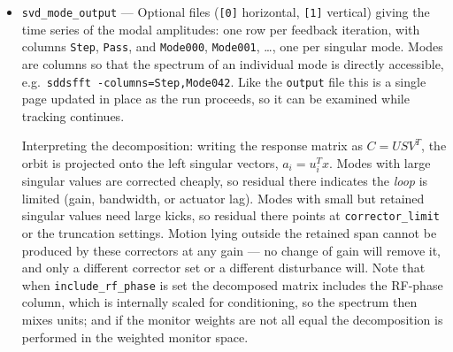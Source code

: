 \documentclass[11pt]{article}
\begin{document}
\begin{itemize}
  Note the normalization, which differs from the rms columns of the \verb|output| file:
  \verb|RmsAmplitude| is the modal \emph{coefficient} $a_i=u_i^T x$ (in m) and is not divided by the
  number of monitors, whereas \verb|xBpmRms| and its relatives are.  Since the $u_i$ are orthonormal,
  the two are related by $\sum_i a_i^2 = N_{\rm mon}\,{\rm rms}^2$, so an individual mode amplitude is
  legitimately about $\sqrt{N_{\rm mon}}$ times larger than the rms it contributes --- the files are
  consistent, not contradictory.  That identity is also a useful check: summed over all modes it
  recovers the total orbit power, and any shortfall is precisely the motion lying outside the span of
  the correctors.

\item \verb|svd_mode_output| --- Optional files (\verb|[0]| horizontal, \verb|[1]| vertical) giving
  the time series of the modal amplitudes: one row per feedback iteration, with columns \verb|Step|,
  \verb|Pass|, and \verb|Mode000|, \verb|Mode001|, \dots, one per singular mode.  Modes are columns
  so that the spectrum of an individual mode is directly accessible, e.g.\
  \verb|sddsfft -columns=Step,Mode042|.  Like the \verb|output| file this is a single page updated
  in place as the run proceeds, so it can be examined while tracking continues.

  Interpreting the decomposition: writing the response matrix as $C=USV^T$, the orbit is projected
  onto the left singular vectors, $a_i=u_i^T x$.  Modes with large singular values are corrected
  cheaply, so residual there indicates the \emph{loop} is limited (gain, bandwidth, or actuator lag).
  Modes with small but retained singular values need large kicks, so residual there points at
  \verb|corrector_limit| or the truncation settings.  Motion lying outside the retained span cannot
  be produced by these correctors at any gain --- no change of gain will remove it, and only a
  different corrector set or a different disturbance will.  Note that when \verb|include_rf_phase| is
  set the decomposed matrix includes the RF-phase column, which is internally scaled for
  conditioning, so the spectrum then mixes units; and if the monitor weights are not all equal the
  decomposition is performed in the weighted monitor space.


\end{itemize}
\end{document}
